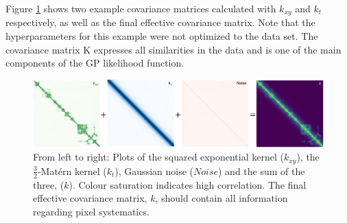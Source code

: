 \documentclass[twocolumn]{aastex61}
\begin{document}
Figure \ref{fig:covmats} shows two example covariance matrices calculated with $k_{xy}$ and $k_{t}$ respectively, as well as the final effective covariance matrix. Note that the hyperparameters for this example were not optimized to the data set. The covariance matrix $\boldsymbol{\mathrm{K}}$ expresses all similarities in the data and is one of the main components of the GP likelihood function.

\begin{figure}
  \includegraphics[width=\linewidth]{figs/covmats.png}
  \caption{\small From left to right: Plots of the squared exponential kernel ($k_{xy}$), the $\frac{3}{2}$-Mat\'ern kernel ($k_{t}$), Gaussian noise ($Noise$) and the sum of the three, ($k$). Colour saturation indicates high correlation. The final effective covariance matrix, $k$, should contain all information regarding pixel systematics.}
  \label{fig:covmats}
\end{figure}
\end{document}
